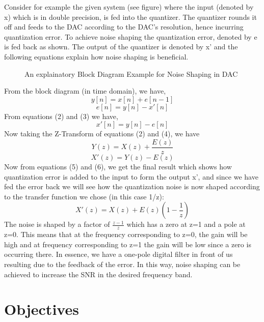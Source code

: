 \documentclass[colorlinks=true,pdfstartview=FitV,linkcolor=blue,
            citecolor=red,urlcolor=magenta]{ligodoc}
\begin{document}
Consider for example the given system (see figure) where the input (denoted by x) which is in double precision, is fed into the quantizer. The quantizer rounds it off and feeds to the DAC according to the DAC's resolution, hence incurring quantization error. To achieve noise shaping the quantization error, denoted by e is fed back as shown. The output of the quantizer is denoted by x' and the following equations explain how noise shaping is beneficial.
\begin{figure}[htbp]

  \centering
  
  \caption{An explainatory Block Diagram Example for Noise Shaping in DAC}

\end{figure}
From the block diagram (in time domain), we have,
\begin{equation}
y[n]=x[n]+e[n-1]
\end{equation}
\begin{equation}
e[n]=y[n]-x'[n]
\end{equation}
From equations (2) and (3) we have,
\begin{equation}
x'[n]=y[n]-e[n]
\end{equation}
Now taking the Z-Transform of equations (2) and (4), we have
\begin{equation}
Y(z)=X(z)+\frac{E(z)}{z}
\end{equation}
\begin{equation}
X'(z)=Y(z)-E(z)
\end{equation}
Now from equations (5) and (6), we get the final result which shows how quantization error is added to the input to form the output x', and since we have fed the error back we will see how the quantization noise is now shaped according to the transfer function we chose (in this case 1/z):
\begin{equation}
X'(z)=X(z)+E(z)(1-\frac{1}{z})
\end{equation}
The noise is shaped by a factor of $\frac{z-1}{z}$ which has a zero at z=1 and a pole at z=0. This means that at the frequency corresponding to z=0, the gain will be high and at frequency corresponding to z=1 the gain will be low since a zero is occurring there. In essence, we have a one-pole digital filter in front of us resulting due to the feedback of the error. In this way, noise shaping can be achieved to increase the SNR in the desired frequency band.
\section{Objectives}
\end{document}
